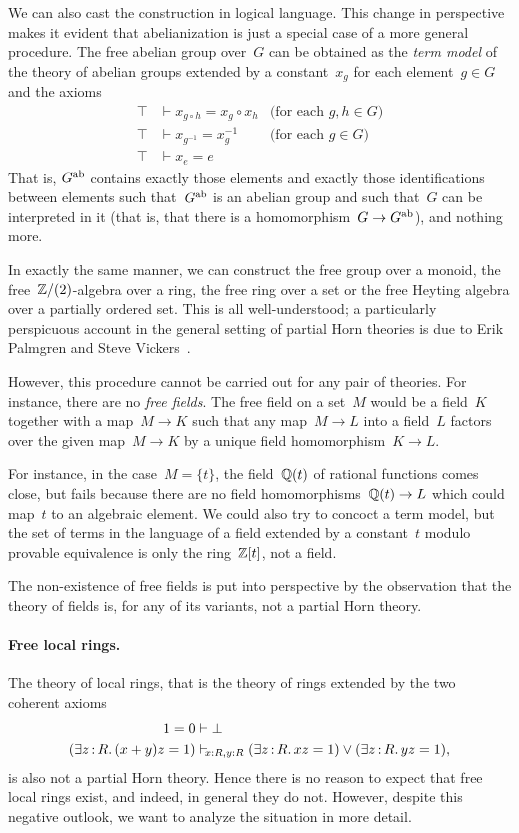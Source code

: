 \documentclass{ws-rv9x6}
\begin{document}
{We can also cast the construction in logical language. This change in perspective makes it evident
that abelianization is just a special case of a more general procedure.
The free abelian group over~$G$ can be obtained as the \emph{term model} of the
theory of abelian groups extended by a constant~$x_g$ for each element~$g \in
G$ and the axioms
\begin{align*}
  \top &\vdash x_{g \circ h} = x_g \circ x_h & \text{(for each~$g,h \in G$)} \\
  \top &\vdash x_{g^{-1}} = x_g^{-1} & \text{(for each~$g \in G$)} \\
  \top &\vdash x_e = e
\end{align*}
That is, $G^{\mathrm{ab}}$ contains exactly those elements and exactly those
identifications between elements such that~$G^{\mathrm{ab}}$ is an abelian group and such
that~$G$ can be interpreted in it (that is, that there is a homomorphism~$G \to
G^{\mathrm{ab}}$), and nothing more.

In exactly the same manner, we can construct the free group over a monoid, the
free~$\mathbb{Z}/(2)$-algebra over a ring, the free ring over a set or the free
Heyting algebra over a partially ordered set. This is all well-understood; a
particularly perspicuous account in the general setting of partial Horn
theories is due to Erik Palmgren and Steve Vickers~\cite[Section~5]{palmgren-vickers:partial-horn}.

However, this procedure cannot be carried out for any pair of theories. For
instance, there are no \emph{free fields}. The free field on a set~$M$ would be
a field~$K$ together with a map~$M \to K$ such that any map~$M \to L$ into a field~$L$ factors
over the given map~$M \to K$ by a unique field homomorphism~$K \to L$.

For instance, in the case~$M = \{ t \}$, the field~$\mathbb{Q}(t)$ of rational
functions comes close, but fails because there are no field homomorphisms~$\mathbb{Q}(t)
\to L$ which could map~$t$ to an algebraic element. We could also try to
concoct a term model, but the set of terms in the language of a field extended
by a constant~$t$ modulo provable equivalence is only the ring~$\mathbb{Z}[t]$, not a
field.

The non-existence of free fields is put into perspective by the observation that the
theory of fields is, for any of its variants, not a partial Horn theory.

\paragraph{Free local rings.} The theory of local rings, that is the theory of
rings extended by the two coherent axioms
\begin{align*}
  1 = 0 &\vdash \bot \\
  (\exists z\,{:}\,R\mathpunct{.} (x+y)z = 1) &\mathrel{\vdash\!\!\!_{x:R,y:R}} (\exists z\,{:}\,R\mathpunct{.} xz = 1) \vee
  (\exists z\,{:}\,R\mathpunct{.} yz = 1),
\end{align*}
is also not a partial Horn theory. Hence there is no reason to expect that free
local rings exist, and indeed, in general they do not. However, despite this
negative outlook, we want to analyze the situation in more detail.

}
\end{document}
